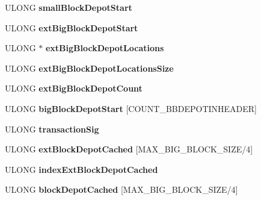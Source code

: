 \begin{DoxyCompactItemize}
U\+L\+O\+NG {\bfseries small\+Block\+Depot\+Start}
\item 
\mbox{\label{struct_storage_impl_a50d25036dc679bc2d4de71549960d3ed}} 
U\+L\+O\+NG {\bfseries ext\+Big\+Block\+Depot\+Start}
\item 
\mbox{\label{struct_storage_impl_a405604aeba8414aa1587ce946beafe68}} 
U\+L\+O\+NG $\ast$ {\bfseries ext\+Big\+Block\+Depot\+Locations}
\item 
\mbox{\label{struct_storage_impl_a917c8cbbf82c56814292c52decc4e2ec}} 
U\+L\+O\+NG {\bfseries ext\+Big\+Block\+Depot\+Locations\+Size}
\item 
\mbox{\label{struct_storage_impl_a692afe13da8ea45288cee50d8e0837f8}} 
U\+L\+O\+NG {\bfseries ext\+Big\+Block\+Depot\+Count}
\item 
\mbox{\label{struct_storage_impl_a7a6af06bfc821a9b241ab1a70293ba71}} 
U\+L\+O\+NG {\bfseries big\+Block\+Depot\+Start} \mbox{[}C\+O\+U\+N\+T\+\_\+\+B\+B\+D\+E\+P\+O\+T\+I\+N\+H\+E\+A\+D\+ER\mbox{]}
\item 
\mbox{\label{struct_storage_impl_a0d571b2276c72465ae941d7fa6e6f66a}} 
U\+L\+O\+NG {\bfseries transaction\+Sig}
\item 
\mbox{\label{struct_storage_impl_ae9ee744193190fa7833f2309b085e235}} 
U\+L\+O\+NG {\bfseries ext\+Block\+Depot\+Cached} \mbox{[}M\+A\+X\+\_\+\+B\+I\+G\+\_\+\+B\+L\+O\+C\+K\+\_\+\+S\+I\+ZE/4\mbox{]}
\item 
\mbox{\label{struct_storage_impl_aed2006ce0dcba516d3f126d509f4a171}} 
U\+L\+O\+NG {\bfseries index\+Ext\+Block\+Depot\+Cached}
\item 
\mbox{\label{struct_storage_impl_ac79b1b1196d48fb2f1f71dc52dbda3b9}} 
U\+L\+O\+NG {\bfseries block\+Depot\+Cached} \mbox{[}M\+A\+X\+\_\+\+B\+I\+G\+\_\+\+B\+L\+O\+C\+K\+\_\+\+S\+I\+ZE/4\mbox{]}
\item 
\mbox{\label{struct_storage_impl_a7566d2576da9966aa9e182c338706934}} 

\end{DoxyCompactItemize}
